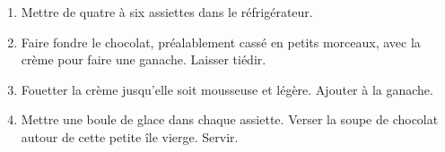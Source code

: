 
\begin{ingredients}
\end{ingredients}


\begin{recipe}
  \begin{enumerate}

  \item Mettre de quatre \`a six assiettes dans le r\'efrig\'erateur.

  \item Faire fondre le chocolat, pr\'ealablement cass\'e en petits
    morceaux, avec la cr\`eme pour faire une ganache.  Laisser
    ti\'edir.  

  \item Fouetter la cr\`eme jusqu'elle soit mousseuse et l\'eg\`ere.
    Ajouter \`a la ganache.

  \item Mettre une boule de glace dans chaque assiette.  Verser la
    soupe de chocolat autour de cette petite \^ile vierge.  Servir.

  \end{enumerate}
\end{recipe}
